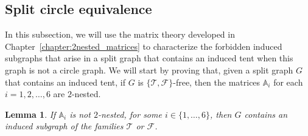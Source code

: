 \documentclass[12pt]{book}
\theoremstyle{plain}
\newtheorem{lema}[teo]{Lemma}
\theoremstyle{remark}
\begin{document}
                
\subsection{Split circle equivalence} \label{subsec:tent3}

In this subsection, we will use the matrix theory developed in Chapter~\ref{chapter:2nested_matrices} to characterize the forbidden induced subgraphs that arise in a split graph that contains an induced tent when this graph is not a circle graph. We will start by proving that, given a split graph $G$ that contains an induced tent, if $G$ is $\{ \mathcal{T}, \mathcal{F} \}$-free, then the matrices $\mathbb A_i$ for each $i=1, 2, \ldots, 6$ are $2$-nested. 

\begin{lema} \label{lema:equiv_circle_2nested_tent}
	If $\mathbb A_i$ is not $2$-nested, for some $i \in \{ 1, \ldots, 6 \}$, then $G$ contains an induced subgraph of the families $\mathcal{T}$ or $\mathcal{F}$.
\end{lema}
\end{document}
